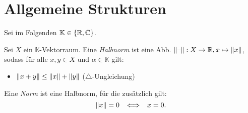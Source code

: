 \documentclass{cheat-sheet}
\newcommand{\K}{\mathbb{K}}
\begin{document}




\section{Allgemeine Strukturen}

\begin{nota}
  Sei im Folgenden $\K \in \{ \R, \C \}$.
\end{nota}

\begin{defn}
  Sei $X$ ein $\K$-Vektorraum. Eine \emph{Halbnorm} ist eine Abb. $\lVert\text{--}\rVert : X \to \mathbb{R}, x \mapsto \lVert x\rVert$, sodass für alle $x, y \in X$ und $\alpha \in \K$ gilt:
  \begin{itemize}
    \item $\lVert x + y\rVert \leq \lVert x\rVert + \lVert y\rVert$ \enspace ($\triangle$-Ungleichung)
  \end{itemize}
  Eine \emph{Norm} ist eine Halbnorm, für die zusätzlich gilt:
  \[ \lVert x\rVert = 0 \enspace \iff \enspace x = 0. \]
\end{defn}
\end{document}
